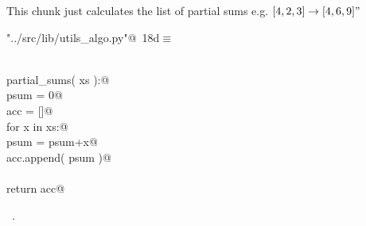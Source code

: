 \documentclass[11.5pt]{report}
\begin{document}
\vspace{-0.8cm}
\newchunk This chunk just calculates the list of partial sums e.g. $[4,2,3] \rightarrow [4,6,9]"$
\begin{flushleft} \small\label{scrap16}\raggedright\small
{} \verb@"../src/lib/utils_algo.py"@\nobreak\ {\footnotesize {18d}}$\equiv$
\vspace{-1ex}
\begin{list}{}{} \item
\mbox{}\verb@@\\
\mbox{}\verb@def partial_sums( xs ):@\\
\mbox{}\verb@    psum = 0@\\
\mbox{}\verb@    acc = []@\\
\mbox{}\verb@    for x in xs:@\\
\mbox{}\verb@        psum = psum+x@\\
\mbox{}\verb@        acc.append( psum )@\\
\mbox{}\verb@@\\
\mbox{}\verb@    return acc@\\
\mbox{}\verb@@{\NWsep}
\end{list}
\vspace{-1.5ex}
\footnotesize
\begin{list}{}{\setlength{\itemsep}{-\parsep}\setlength{\itemindent}{-\leftmargin}}
\item \NWtxtFileDefBy\ .

\item{}
\end{list}
\vspace{4ex}
\end{flushleft}
\end{document}
